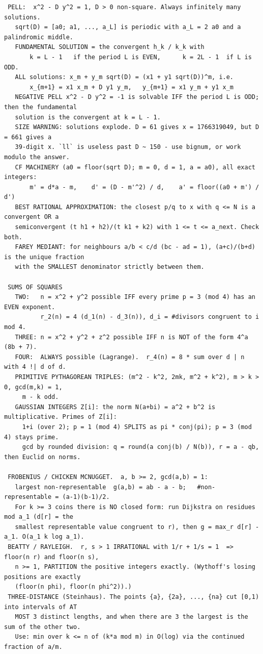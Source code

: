 \documentclass[9pt,a4paper,twocolumn]{extarticle}
\begin{document}
\begin{lstlisting}
 PELL:  x^2 - D y^2 = 1, D > 0 non-square. Always infinitely many solutions.
   sqrt(D) = [a0; a1, ..., a_L] is periodic with a_L = 2 a0 and a palindromic middle.
   FUNDAMENTAL SOLUTION = the convergent h_k / k_k with
       k = L - 1   if the period L is EVEN,      k = 2L - 1  if L is ODD.
   ALL solutions: x_m + y_m sqrt(D) = (x1 + y1 sqrt(D))^m, i.e.
       x_{m+1} = x1 x_m + D y1 y_m,   y_{m+1} = x1 y_m + y1 x_m
   NEGATIVE PELL x^2 - D y^2 = -1 is solvable IFF the period L is ODD; then the fundamental
   solution is the convergent at k = L - 1.
   SIZE WARNING: solutions explode. D = 61 gives x = 1766319049, but D = 661 gives a
   39-digit x. `ll` is useless past D ~ 150 - use bignum, or work modulo the answer.
   CF MACHINERY (a0 = floor(sqrt D); m = 0, d = 1, a = a0), all exact integers:
       m' = d*a - m,    d' = (D - m'^2) / d,    a' = floor((a0 + m') / d')
   BEST RATIONAL APPROXIMATION: the closest p/q to x with q <= N is a convergent OR a
   semiconvergent (t h1 + h2)/(t k1 + k2) with 1 <= t <= a_next. Check both.
   FAREY MEDIANT: for neighbours a/b < c/d (bc - ad = 1), (a+c)/(b+d) is the unique fraction
   with the SMALLEST denominator strictly between them.

 SUMS OF SQUARES
   TWO:   n = x^2 + y^2 possible IFF every prime p = 3 (mod 4) has an EVEN exponent.
          r_2(n) = 4 (d_1(n) - d_3(n)), d_i = #divisors congruent to i mod 4.
   THREE: n = x^2 + y^2 + z^2 possible IFF n is NOT of the form 4^a (8b + 7).
   FOUR:  ALWAYS possible (Lagrange).  r_4(n) = 8 * sum over d | n with 4 !| d of d.
   PRIMITIVE PYTHAGOREAN TRIPLES: (m^2 - k^2, 2mk, m^2 + k^2), m > k > 0, gcd(m,k) = 1,
     m - k odd.
   GAUSSIAN INTEGERS Z[i]: the norm N(a+bi) = a^2 + b^2 is multiplicative. Primes of Z[i]:
     1+i (over 2); p = 1 (mod 4) SPLITS as pi * conj(pi); p = 3 (mod 4) stays prime.
     gcd by rounded division: q = round(a conj(b) / N(b)), r = a - qb, then Euclid on norms.

 FROBENIUS / CHICKEN MCNUGGET.  a, b >= 2, gcd(a,b) = 1:
   largest non-representable  g(a,b) = ab - a - b;   #non-representable = (a-1)(b-1)/2.
   For k >= 3 coins there is NO closed form: run Dijkstra on residues mod a_1 (d[r] = the
   smallest representable value congruent to r), then g = max_r d[r] - a_1. O(a_1 k log a_1).
 BEATTY / RAYLEIGH.  r, s > 1 IRRATIONAL with 1/r + 1/s = 1  =>  floor(n r) and floor(n s),
   n >= 1, PARTITION the positive integers exactly. (Wythoff's losing positions are exactly
   (floor(n phi), floor(n phi^2)).)
 THREE-DISTANCE (Steinhaus). The points {a}, {2a}, ..., {na} cut [0,1) into intervals of AT
   MOST 3 distinct lengths, and when there are 3 the largest is the sum of the other two.
   Use: min over k <= n of (k*a mod m) in O(log) via the continued fraction of a/m.


\end{lstlisting}
\end{document}
